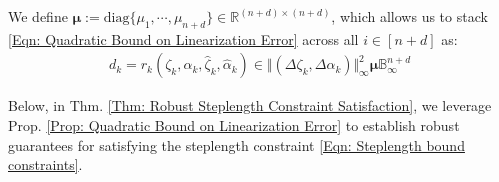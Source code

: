 \documentclass[letterpaper, 10 pt, conference]{ieeeconf}
\newcommand{\diag}{\text{diag}}
\newcommand{\R}{\mathbb{R}}
\newcommand{\?}{\stackrel{?}{=}}
\newcommand{\paramDim}{d}
\newcommand{\varDim}{n}
\newcommand{\ratePGDNominal}{\hat\ratePGD}
\newcommand{\ratePGDError}{\Delta\ratePGD}
\newcommand{\ballUnit}{\mathbb{B}}
\newcommand{\linearizationError}{r}
\newcommand{\disturbance}{d}
\newcommand{\ratePGD}{\alpha}
\newcommand{\state}{\zeta}
\newcommand{\stateNominal}{\hat\state}
\newcommand{\stateError}{\Delta\state}
\newcommand{\dynamicsFullState}{f}
\newcommand{\hessianBound}{\mu}
\newcommand{\hessianBoundStacked}{\boldsymbol{\mu}}
\begin{document}
We define $\hessianBoundStacked := \diag\{\hessianBound_1, \cdots, \hessianBound_{\varDim + \paramDim} \} \in \R^{(\varDim + \paramDim) \times (\varDim + \paramDim)}$, which allows us to stack \eqref{Eqn: Quadratic Bound on Linearization Error} across all $i \in [\varDim + \paramDim]$ as:
{
\setlength{\abovedisplayskip}{3.5pt}
\setlength{\belowdisplayskip}{3.5pt}
\begin{align}
\label{Eqn: Disturbance Bound, Stacked}
    \disturbance_k = \linearizationError_k(\state_k, \ratePGD_k, \stateNominal_k, \ratePGDNominal_k) \in \Vert (\stateError_k, \ratePGDError_k) \Vert_\infty^2 \hessianBoundStacked \ballUnit_\infty^{\varDim + \paramDim}
\end{align}
}

Below, in Thm. \ref{Thm: Robust Steplength Constraint Satisfaction}, we leverage Prop. \ref{Prop: Quadratic Bound on Linearization Error} to establish robust guarantees for satisfying the steplength constraint \eqref{Eqn: Steplength bound constraints}.
\end{document}
